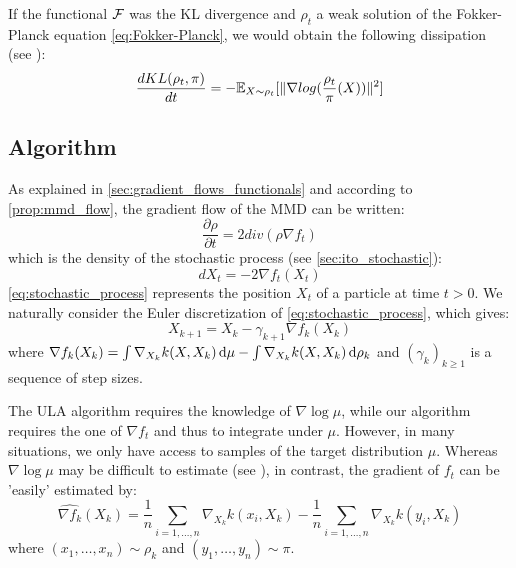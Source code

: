 \begin{remark}
	If the functional ${{\mathcal F}}$ was the KL divergence and $\rho_t$ a weak solution of the Fokker-Planck equation \eqref{eq:Fokker-Planck}, we would obtain the following dissipation (see \cite{wibisono2018sampling}):
	\begin{equation}
	\frac{d KL(\rho_t, \pi)}{dt}=-{{\mathbb E}}_{X \sim \rho_t}[\|\nabla log(\frac{\rho_t}{\pi}(X))\|^2]
	\end{equation}
\end{remark}




\subsection{Algorithm}

As explained in \cref{sec:gradient_flows_functionals} and according to \cref{prop:mmd_flow}, the gradient flow of the MMD can be written:
\begin{equation*}
\frac{\partial \rho}{\partial t}= 2 div(\rho  \nabla f_t)
\end{equation*}
which is the density of the stochastic process (see \cref{sec:ito_stochastic}):
\begin{equation}\label{eq:stochastic_process}
dX_t=-2\nabla f_t(X_t) 
\end{equation}
\eqref{eq:stochastic_process} represents the position $X_t$ of a particle at time $t > 0$.
We naturally consider the Euler discretization of \eqref{eq:stochastic_process}, which gives:
\begin{equation}\label{eq:discretization}
X_{k+1}=X_k - \gamma_{k+1} \nabla f_k(X_k)
\end{equation}
where $\nabla f_k(X_k)= \int \nabla_{X_k}k(X,X_k)\mathop{}\!\mathrm{d} \mu - \int \nabla_{X_k}k(X,X_k) \mathop{}\!\mathrm{d} \rho_k$ and $(\gamma_k)_{k\ge1}$ is a sequence of step sizes.


\begin{remark} The ULA algorithm requires the knowledge of $\nabla \log \mu$, while our algorithm requires the one of $\nabla f_t$ and thus to integrate under $\mu$. However, in many situations, we only have access to samples of the target distribution $\mu$. Whereas $\nabla \log \mu$ may be difficult to estimate (see \cite{li2017gradient}), in contrast, the gradient of $f_t$ can be 'easily' estimated by:
\begin{equation}
\widehat{\nabla f_k}(X_k)=\frac{1}{n}\sum_{i=1,\dots,n}\nabla_{X_k}k(x_i,X_k) - \frac{1}{n}\sum_{i=1,\dots,n}\nabla_{X_k}k(y_i,X_k)
\end{equation}
where $(x_1, \dots, x_n)\sim \rho_k$ and $(y_1, \dots, y_n)\sim \pi$. 
\end{remark}


